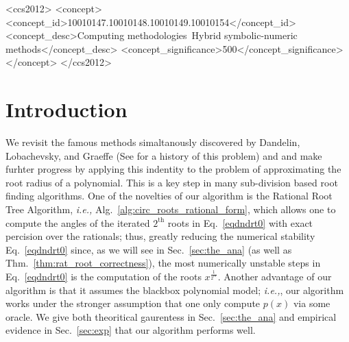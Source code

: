 \documentclass[sigconf]{acmart}
\begin{document}
\begin{CCSXML}
<ccs2012>
   <concept>
       <concept_id>10010147.10010148.10010149.10010154</concept_id>
       <concept_desc>Computing methodologies~Hybrid symbolic-numeric methods</concept_desc>
       <concept_significance>500</concept_significance>
       </concept>
 </ccs2012>
\end{CCSXML}






\maketitle

\section{Introduction}
 We revisit the famous methods simaltanously discovered by Dandelin, Lobachevsky, and Graeffe (See \cite{10.2307/2310626} for a history of this problem) and and make furhter progress by applying this indentity to the problem of approximating the root radius of a polynomial.
This is a key step in many sub-division based root finding algorithms.
One of the novelties of our algorithm is the Rational Root Tree Algorithm, \emph{i.e.,} Alg.~\ref{alg:circ_roots_rational_form}, which allows one to compute the angles of the iterated $2^\mathrm{th}$ roots in Eq.~\ref{eqdndrt0} with exact percision over the rationals; thus, greatly reducing the numerical stability Eq.~\ref{eqdndrt0} since, as we will see in Sec.~\ref{sec:the_ana} (as well as Thm.~\ref{thm:rat_root_correctness}), the most numerically unstable steps in Eq.~\ref{eqdndrt0} is the computation of the roots $x^{\frac{1}{2^m}}$.
Another advantage of our algorithm is that it assumes the blackbox polynomial model; \emph{i.e.,}, our algorithm works under the stronger assumption that one only compute $p(x)$ via some oracle.
We give both theoritical gaurentess in Sec.~\ref{sec:the_ana} and empirical evidence in Sec.~\ref{sec:exp} that our algorithm performs well.
\end{document}

